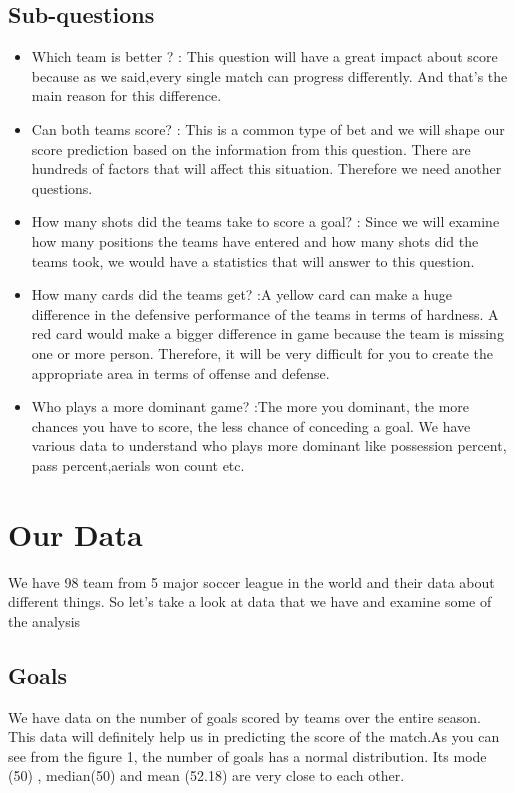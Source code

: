 \documentclass[conference]{IEEEtran}
\begin{document}
\subsection{Sub-questions}
\begin{itemize}
\item Which team is better ? : This question will have a great impact about score because as we said,every single match can progress differently. And that's 
the main reason for this difference.
\item Can both teams score? : This is a common type of bet and we will shape our score prediction based on the information from this question. There are hundreds of factors that will affect this situation. Therefore we need another questions.
\item How many shots did the teams take to score a goal? : Since we will examine how many positions the teams have entered and how many shots did the
teams took, we would have a statistics that will answer to this question.
\item How many cards did the teams get? :A yellow card can make a huge difference in the defensive performance of the teams in terms of hardness. A red card 
would make a bigger difference in game because the team is missing one or more person. Therefore, it will be very difficult for you to create the appropriate area in terms of offense and defense.
\item Who plays a more dominant game? :The more you dominant, the more chances you have to score, the less chance of conceding a goal. We have various data to understand who plays more dominant like possession percent, pass percent,aerials won count etc.
\end{itemize}

\section{Our Data}
We have 98 team from 5 major soccer league in the world and their data about different things. So let's take a look at data that we have and examine some of the analysis

\subsection{Goals}
We have data on the number of goals scored by teams over the entire season. This data will definitely help us in predicting the score of the match.As you can see from the figure 1, the number of goals has a normal distribution. Its mode (50) , median(50)  and mean (52.18)  are very close to each other.
\end{document}
